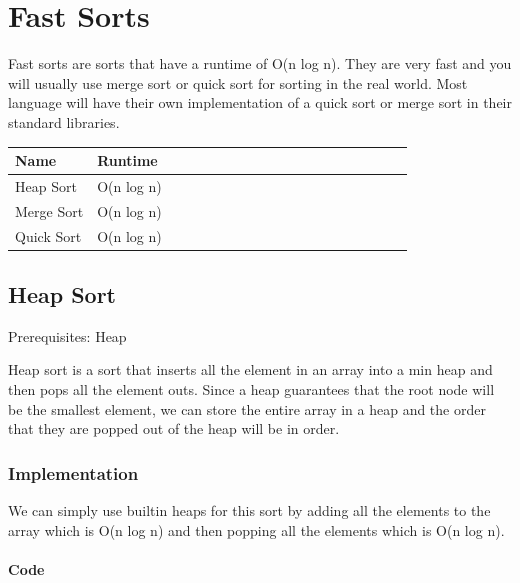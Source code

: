 \documentclass[11pt,oneside]{book}
\begin{document}
    \chapter{ Fast Sorts }
        

Fast sorts are sorts that have a runtime of O(n log n). They are very fast and you will usually use merge sort or quick sort for sorting in the real world. Most language will have their own implementation of a quick sort or merge sort in their standard libraries.

\begin{center}\begin{tabulary}{0.4\linewidth}{|l|l|l|l|l|l|l|l|l|l|l|l|l|l|l|l|l|l|l}\hline


  Name &
  Runtime\\
\hline


  Heap Sort &
  O(n log n)\\

  Merge Sort &
  O(n log n)\\

  Quick Sort &
  O(n log n)\\

\hline\end{tabulary}\end{center}


        \section{ Heap Sort }
        

Prerequisites: Heap

Heap sort is a sort that inserts all the element in an array into a min heap and then pops all the element outs. Since a heap guarantees that the root node will be the smallest element, we can store the entire array in a heap and the order that they are popped out of the heap will be in order.

\subsection{Implementation}

We can simply use builtin heaps for this sort by adding all the elements to the array which is O(n log n) and then popping all the elements which is O(n log n).

\subsubsection{Code}
\end{document}

